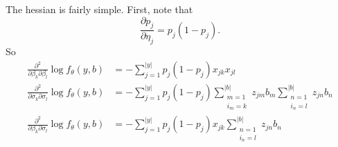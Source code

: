 \documentclass{article}
\begin{document}
The hessian is fairly simple.  First, note that
$$
   \frac{\partial p_j}{\partial \eta_j} = p_j (1 - p_j).
$$
So
\begin{subequations}
\begin{align}
   \label{eq:hess-beta-beta}
   \frac{\partial^2}{\partial \beta_k \partial \beta_l} \log f_\theta(y, b)
   & =
   - \sum_{j = 1}^{\lvert y \rvert} p_j (1 - p_j) x_{j k} x_{j l}
   \\
   \label{eq:hess-sigma-sigma}
   \frac{\partial^2}{\partial \sigma_k \partial \sigma_l} \log f_\theta(y, b)
   & =
   - \sum_{j = 1}^{\lvert y \rvert} p_j (1 - p_j)
   \sum_{\substack{m = 1 \\ i_m = k}}^{\lvert b \rvert} z_{j m} b_m
   \sum_{\substack{n = 1 \\ i_n = l}}^{\lvert b \rvert} z_{j n} b_n
   \\
   \label{eq:hess-beta-sigma}
   \frac{\partial^2}{\partial \beta_k \partial \sigma_l} \log f_\theta(y, b)
   & =
   - \sum_{j = 1}^{\lvert y \rvert} p_j (1 - p_j)
   x_{j k} 
   \sum_{\substack{n = 1 \\ i_n = l}}^{\lvert b \rvert} z_{j n} b_n
\end{align}
\end{subequations}
\end{document}
